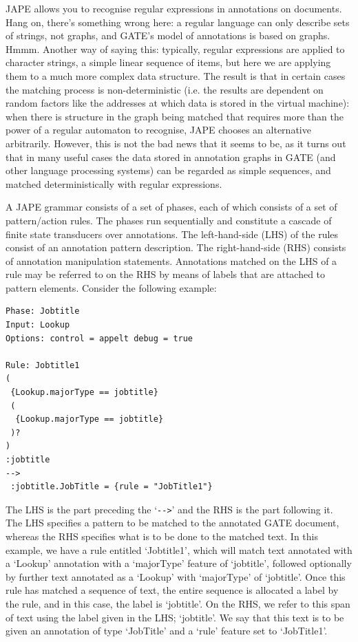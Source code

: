 JAPE allows you to recognise regular expressions in annotations on documents.
Hang on, there's something wrong here: a regular language can only describe
sets of strings, not graphs, and GATE's model of annotations is based on
graphs. Hmmm. Another way of saying this: typically, regular expressions are
applied to character strings, a simple linear sequence of items,
but here we are applying them to a much more complex data structure. The
result is that in certain cases the matching process is non-deterministic
(i.e. the results are dependent on random factors like the addresses at which
data is stored in the virtual machine): when there is structure in the graph
being matched that requires more than the power of a regular automaton to
recognise, JAPE chooses an alternative arbitrarily. However, this is not the
bad news that it seems to be, as it turns out that in many useful cases the
data stored in annotation graphs in GATE (and other language processing
systems) can be regarded as simple sequences, and matched deterministically
with regular expressions.

A JAPE grammar consists of a set of phases, each of which consists of a set of
pattern/action rules. The phases run sequentially and constitute a cascade of
finite state transducers over annotations. The left-hand-side (LHS) of the rules
consist of an annotation pattern description. The right-hand-side (RHS) consists
of annotation manipulation statements. Annotations matched on the LHS of a rule may be
referred to on the RHS by means of labels that are attached to pattern
elements. Consider the following example:

\begin{small}
\begin{verbatim}
Phase: Jobtitle
Input: Lookup
Options: control = appelt debug = true

Rule: Jobtitle1
(
 {Lookup.majorType == jobtitle} 
 (
  {Lookup.majorType == jobtitle} 
 )?
)
:jobtitle
-->
 :jobtitle.JobTitle = {rule = "JobTitle1"}
\end{verbatim}
\end{small}

The LHS is the part preceding the `\verb|-->|' and the RHS is the part following
it. The LHS specifies a pattern to be matched to the annotated GATE document, whereas the
RHS specifies what is to be done to the matched text. In this example, we have a
rule entitled `Jobtitle1', which will match text annotated with a `Lookup'
annotation with a `majorType' feature of `jobtitle', followed optionally by
further text annotated as a `Lookup' with `majorType' of `jobtitle'. Once this
rule has matched a sequence of text, the entire sequence is allocated a label by
the rule, and in this case, the label is `jobtitle'. On the RHS, we refer to this
span of text using the label given in the LHS; `jobtitle'. We say that this text
is to be given an annotation of type `JobTitle' and a `rule' feature set to
`JobTitle1'.

